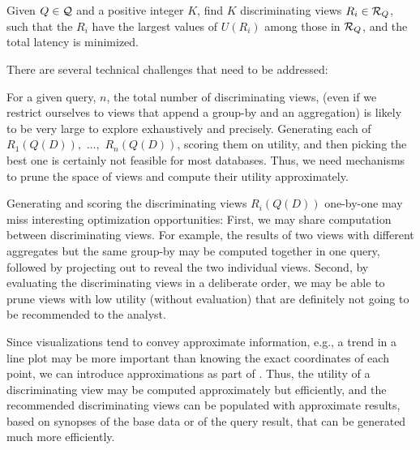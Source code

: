 Given $Q \in \mathcal{Q}$ and a positive integer $K$, find $K$ discriminating views
$R_i \in \mathcal{R}_Q$, such that the $R_i$ have the largest values of $U(R_i)$ among
those in $\mathcal{R}_Q$, and the total latency is minimized.


\noindent There are several technical challenges that need to be addressed:

\begin{denselist}

\item For a given query, $n$, the total number of discriminating views, (even if
we restrict ourselves to views that append a group-by and an aggregation) is
likely to be very large to explore exhaustively and precisely. Generating each
of $R_1(Q(D)),$  $\ldots,$ $R_n(Q(D))$, scoring them on utility, and then
picking the best one is certainly not feasible for most databases. Thus, we need
mechanisms to prune the space of views and compute their utility approximately.

\item Generating and scoring the discriminating views $R_i(Q(D))$ one-by-one may
miss interesting optimization opportunities: First, we may share computation
between discriminating views.  For example, the results of two views with
different aggregates but the same group-by may be computed together in one
query, followed by projecting out to reveal the two individual views.  Second,
by evaluating the discriminating views in a deliberate order, we may be able to
prune views with low utility (without evaluation) that are definitely not going
to be recommended to the analyst.

\item Since visualizations tend to convey approximate information, e.g., a trend
in a line plot may be more important than knowing the exact coordinates of each
point, we can introduce approximations as part of \SeeDB.  Thus, the utility of
a discriminating view may be computed approximately but efficiently, and the
recommended discriminating views can be populated with approximate results,
based on synopses of the base data or of the query result, that can be generated
much more efficiently.

\end{denselist}




